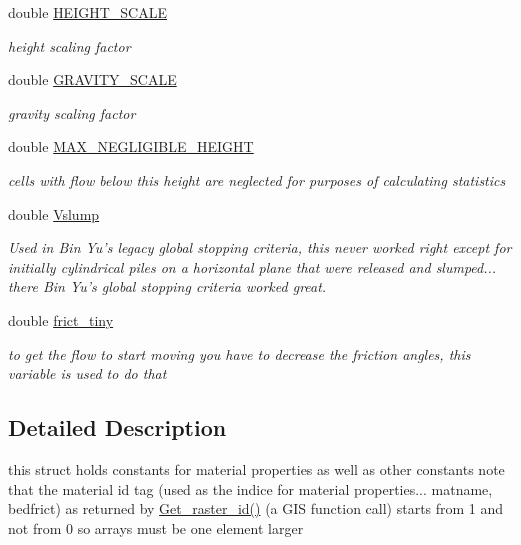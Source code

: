 \begin{CompactItemize}
$$double \hyperlink{structMatProps_o14}{HEIGHT\_\-SCALE}
\begin{CompactList}\small\item\em height scaling factor \item\end{CompactList}\item 
double \hyperlink{structMatProps_o15}{GRAVITY\_\-SCALE}
\begin{CompactList}\small\item\em gravity scaling factor \item\end{CompactList}\item 
double \hyperlink{structMatProps_o16}{MAX\_\-NEGLIGIBLE\_\-HEIGHT}
\begin{CompactList}\small\item\em cells with flow below this height are neglected for purposes of calculating statistics \item\end{CompactList}\item 
double \hyperlink{structMatProps_o17}{Vslump}
\begin{CompactList}\small\item\em Used in Bin Yu's legacy global stopping criteria, this never worked right except for initially cylindrical piles on a horizontal plane that were released and slumped... there Bin Yu's global stopping criteria worked great. \item\end{CompactList}\item 
double \hyperlink{structMatProps_o18}{frict\_\-tiny}
\begin{CompactList}\small\item\em to get the flow to start moving you have to decrease the friction angles, this variable is used to do that \item\end{CompactList}\end{CompactItemize}


\subsection{Detailed Description}
this struct holds constants for material properties as well as other constants note that the material id tag (used as the indice for material properties... matname, bedfrict) as returned by \hyperlink{GisApi_8C_a69}{Get\_\-raster\_\-id()} (a GIS function call) starts from 1 and not from 0 so arrays must be one element larger 



